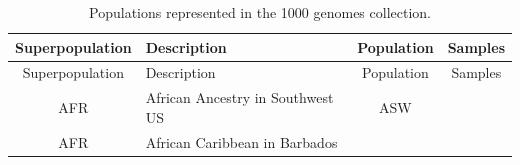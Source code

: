 \documentclass[]{book}
\begin{document}
\begin{longtable}[]{@{}clcc@{}}
\caption{\label{tab:thousand} Populations represented in the 1000 genomes collection.}\tabularnewline
\toprule
\begin{minipage}[b]{0.13\columnwidth}\centering
Superpopulation\strut
\end{minipage} & \begin{minipage}[b]{0.60\columnwidth}\raggedright
Description\strut
\end{minipage} & \begin{minipage}[b]{0.09\columnwidth}\centering
Population\strut
\end{minipage} & \begin{minipage}[b]{0.06\columnwidth}\centering
Samples\strut
\end{minipage}\tabularnewline
\midrule
\endfirsthead
\toprule
\begin{minipage}[b]{0.13\columnwidth}\centering
Superpopulation\strut
\end{minipage} & \begin{minipage}[b]{0.60\columnwidth}\raggedright
Description\strut
\end{minipage} & \begin{minipage}[b]{0.09\columnwidth}\centering
Population\strut
\end{minipage} & \begin{minipage}[b]{0.06\columnwidth}\centering
Samples\strut
\end{minipage}\tabularnewline
\midrule
\endhead
\begin{minipage}[t]{0.13\columnwidth}\centering
AFR\strut
\end{minipage} & \begin{minipage}[t]{0.60\columnwidth}\raggedright
African Ancestry in Southwest US\strut
\end{minipage} & \begin{minipage}[t]{0.09\columnwidth}\centering
ASW\strut
\end{minipage} & \begin{minipage}[t]{0.06\columnwidth}\centering
112\strut
\end{minipage}\tabularnewline
\begin{minipage}[t]{0.13\columnwidth}\centering
AFR\strut
\end{minipage} & \begin{minipage}[t]{0.60\columnwidth}\raggedright
African Caribbean in Barbados\strut
\end{minipage} & \begin{minipage}[t]{0.09\columnwidth}\centering

\end{minipage}
\end{longtable}
\end{document}
